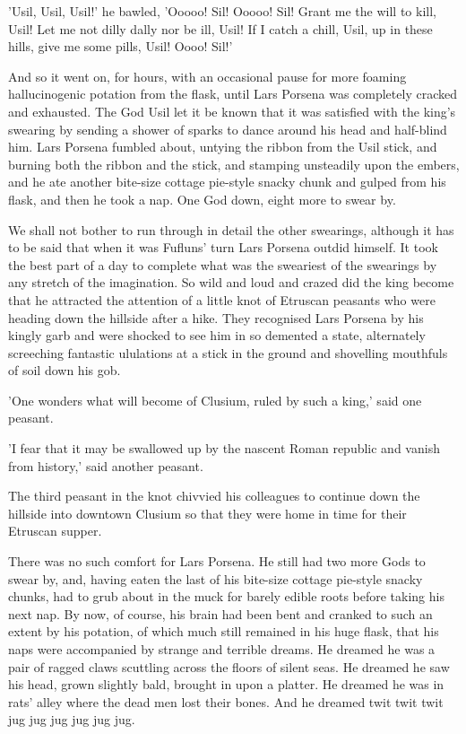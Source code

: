 'Usil, Usil, Usil!' he bawled, 'Ooooo! Sil! Ooooo! Sil! Grant me the will to kill, Usil! Let me not dilly dally nor be ill, Usil! If I catch a chill, Usil, up in these hills, give me some pills, Usil! Oooo! Sil!'

And so it went on, for hours, with an occasional pause for more foaming hallucinogenic potation from the flask, until Lars Porsena was completely cracked and exhausted. The God Usil let it be known that it was satisfied with the king's swearing by sending a shower of sparks to dance around his head and half-blind him. Lars Porsena fumbled about, untying the ribbon from the Usil stick, and burning both the ribbon and the stick, and stamping unsteadily upon the embers, and he ate another bite-size cottage pie-style snacky chunk and gulped from his flask, and then he took a nap. One God down, eight more to swear by.

We shall not bother to run through in detail the other swearings, although it has to be said that when it was Fufluns' turn Lars Porsena outdid himself. It took the best part of a day to complete what was the sweariest of the swearings by any stretch of the imagination. So wild and loud and crazed did the king become that he attracted the attention of a little knot of Etruscan peasants who were heading down the hillside after a hike. They recognised Lars Porsena by his kingly garb and were shocked to see him in so demented a state, alternately screeching fantastic ululations at a stick in the ground and shovelling mouthfuls of soil down his gob.

'One wonders what will become of Clusium, ruled by such a king,' said one peasant.

'I fear that it may be swallowed up by the nascent Roman republic and vanish from history,' said another peasant.

The third peasant in the knot chivvied his colleagues to continue down the hillside into downtown Clusium so that they were home in time for their Etruscan supper.

There was no such comfort for Lars Porsena. He still had two more Gods to swear by, and, having eaten the last of his bite-size cottage pie-style snacky chunks, had to grub about in the muck for barely edible roots before taking his next nap. By now, of course, his brain had been bent and cranked to such an extent by his potation, of which much still remained in his huge flask, that his naps were accompanied by strange and terrible dreams. He dreamed he was a pair of ragged claws scuttling across the floors of silent seas. He dreamed he saw his head, grown slightly bald, brought in upon a platter. He dreamed he was in rats' alley where the dead men lost their bones. And he dreamed twit twit twit jug jug jug jug jug jug.

